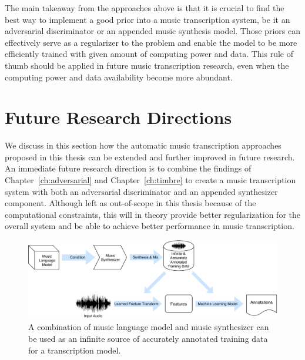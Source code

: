 The main takeaway from the approaches above is that it is crucial to find the best way to implement a good prior into a music transcription system, be it an adversarial discriminator or an appended music synthesis model.
Those priors can effectively serve as a regularizer to the problem and enable the model to be more efficiently trained with given amount of computing power and data.
This rule of thumb should be applied in future music transcription research, even when the computing power and data availability become more abundant.

\section{Future Research Directions}

We discuss in this section how the automatic music transcription approaches proposed in this thesis can be extended and further improved in future research.
An immediate future research direction is to combine the findings of Chapter~\ref{ch:adversarial} and Chapter~\ref{ch:timbre} to create a music transcription system with both an adversarial discriminator and an appended synthesizer component.
Although left as out-of-scope in this thesis because of the computational constraints, this will in theory provide better regularization for the overall system and be able to achieve better performance in music transcription.


\begin{figure}
	\centering
	\includegraphics[width=\textwidth]{paradigms-5-proposed.pdf}
	\caption{A combination of music language model and music synthesizer can be used as an infinite source of accurately annotated training data for a transcription model.}\label{fig:unlimited-data}
\end{figure}


